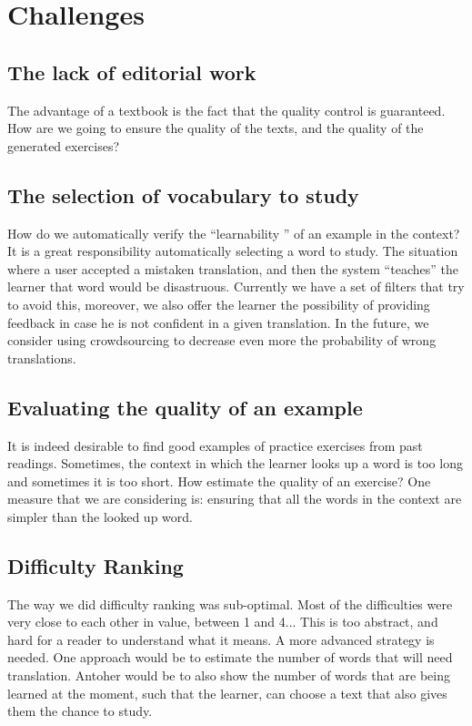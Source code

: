 

\newpage
\section{Challenges}

\subsection{The lack of editorial work}
The advantage of a textbook is the fact that the quality control is guaranteed. How are we going to ensure the quality of the texts, and the quality of the generated exercises? 

\subsection{The selection of vocabulary to study}
How do we automatically verify the ``learnability '' of an example in the context? It is a great responsibility automatically selecting a word to study. The situation where a user accepted a mistaken translation, and then the system ``teaches'' the learner that word would be disastruous. Currently we have a set of filters that try to avoid this, moreover, we also offer the learner the possibility of providing feedback in case he is not confident in a given translation. In the future, we consider using crowdsourcing to decrease even more the probability of wrong translations.



\subsection{Evaluating the quality of an example}

It is indeed desirable to find good examples of practice exercises from past readings. Sometimes, the context in which the learner looks up a word is too long and sometimes it is too short. How estimate the quality of an exercise? One measure that we are considering is: ensuring that all the words in the context are simpler than the looked up word. 


\subsection{Difficulty Ranking}
The way we did difficulty ranking was sub-optimal. Most of the difficulties were very close to each other in value, between 1 and 4... This is too abstract, and hard for a reader to understand what it means. A more advanced strategy is needed. One approach would be to estimate the number of words that will need translation. Antoher would be to also show the number of words that are being learned at the moment, such that the learner, can choose a text that also gives them the chance to study. 

